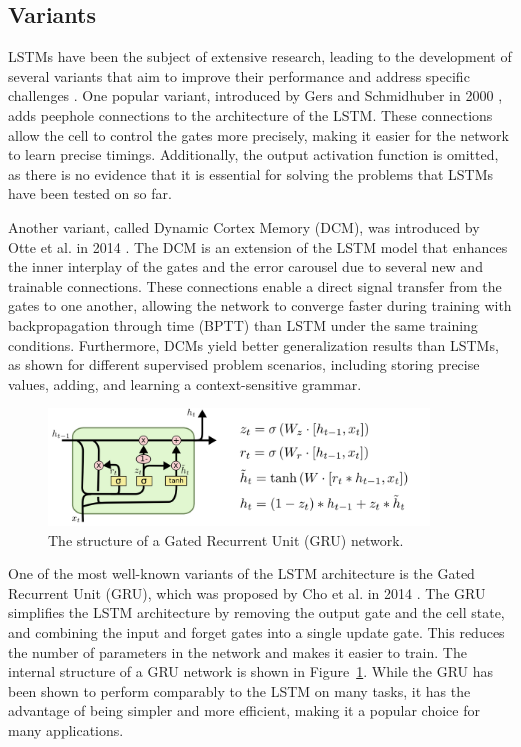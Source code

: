 \documentclass{article}
\newcommand{\reffig}[1]{Figure~\ref{#1}}
\begin{document}
\subsection{Variants}
\label{sec:3.1}

LSTMs have been the subject of extensive research, leading to the development of several
variants that aim to improve their performance and address specific challenges
\cite{greffLSTMSearchSpace2017}. One popular variant, introduced by Gers and Schmidhuber
in 2000 \cite{gersRecurrentNetsTime2000}, adds peephole connections to the architecture
of the LSTM. These connections allow the cell to control the gates more precisely, making
it easier for the network to learn precise timings. Additionally, the output activation
function is omitted, as there is no evidence that it is essential for solving the problems
that LSTMs have been tested on so far.

Another variant, called Dynamic Cortex Memory (DCM), was introduced by Otte et al. in 2014
\cite{otte2014dynamic}. The DCM is an extension of the LSTM model that enhances the inner
interplay of the gates and the error carousel due to several new and trainable
connections. These connections enable a direct signal transfer from the gates to one
another, allowing the network to converge faster during training with backpropagation
through time (BPTT) than LSTM under the same training conditions. Furthermore, DCMs yield
better generalization results than LSTMs, as shown for different supervised problem
scenarios, including storing precise values, adding, and learning a context-sensitive
grammar.


\begin{figure}[htbp]
  \centering
  \includegraphics[width=0.9\textwidth]{LSTM3-var-GRU.png}
  \caption{The structure of a Gated Recurrent Unit (GRU) network. \cite{olahUnderstandingLSTM}}
  \label{fig:gru}
\end{figure}
One of the most well-known variants of the LSTM architecture is the Gated Recurrent Unit
(GRU), which was proposed by Cho et al. in 2014
\cite{choLearningPhraseRepresentations2014}. The GRU simplifies the LSTM architecture by
removing the output gate and the cell state, and combining the input and forget gates into
a single update gate. This reduces the number of parameters in the network and makes it
easier to train. The internal structure of a GRU network is shown in \reffig{fig:gru}.
While the GRU has been shown to perform comparably to the LSTM on many tasks, it has the
advantage of being simpler and more efficient, making it a popular choice for many
applications.
\end{document}
